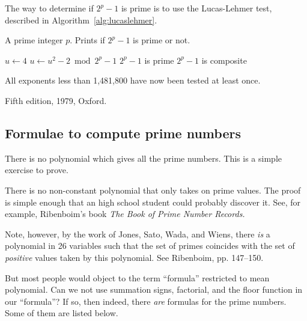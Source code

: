 \bigskip
\bigskip

The way to determine if $2^p-1$ is prime is to use the Lucas-Lehmer
test, described in Algorithm~\ref{alg:lucaslehmer}.

\newcommand{\lucaslehmer}{\ensuremath{\mbox{\sc Lucas-Lehmer}}}
\begin{algorithm}[H]
  \caption{$\lucaslehmer(n)$}\label{alg:lucaslehmer}
  \begin{algorithmic}[1]
    
    \REQUIRE A prime integer $p$.
    \ENSURE Prints if $2^p-1$ is prime or not.

    \smallskip
    
    \STATE $u \leftarrow 4$
        \STATE $u \leftarrow u^2-2 \bmod 2^p-1$
    \ENDFOR
       \PRINT $2^p-1$ is prime
    \ELSE
       \PRINT $2^p-1$ is composite
    \ENDIF
  \end{algorithmic}
\end{algorithm}

All exponents less than 1,481,800 have now been tested at least once.

\Ref

  {Fifth edition, 1979, Oxford.}
 
\subsection{Formulae to compute prime numbers}


There is no polynomial which gives all the prime numbers. This is a
simple exercise to prove.

There is no non-constant polynomial that only takes on prime values.
The proof is simple enough that an high school student could probably
discover it.  See, for example, Ribenboim's book {\it The Book of Prime
  Number Records.}

Note, however, by the work of Jones, Sato, Wada, and Wiens, there {\it
  is} a polynomial in 26 variables such that the set of primes coincides
with the set of {\it positive} values taken by this polynomial.  See
Ribenboim, pp. 147--150.

But most people would object to the term ``formula'' restricted to mean
polynomial.  Can we not use summation signs, factorial, and the floor
function in our ``formula''?  If so, then indeed, there {\it are}
formulas for the prime numbers.  Some of them are listed below.

